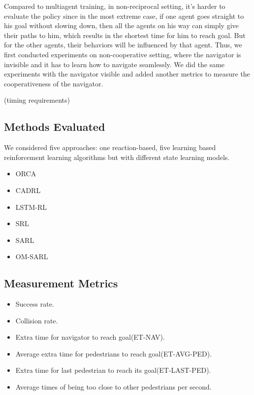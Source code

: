 \documentclass[letterpaper, 10 pt, conference]{ieeeconf}  %
\begin{document}
Compared to multiagent training, in non-reciprocal setting, it's harder to evaluate the policy since in the most extreme case, if one agent goes straight to his goal without slowing down, then all the agents on his way can simply give their paths to him, which results in the shortest time for him to reach goal. But for the other agents, their behaviors will be influenced by that agent. Thus, we first conducted experiments on non-cooperative setting, where the navigator is invisible and it has to learn how to navigate seamlessly. We did the same experiments with the navigator visible and added another metrics to measure the cooperativeness of the navigator. 


(timing requirements)

\subsection{Methods Evaluated}
We considered five approaches: one reaction-based, five learning based reinforcement learning algorithms but with different state learning models.

\begin{itemize}

\item ORCA
\item CADRL
\item LSTM-RL
\item SRL
\item SARL
\item OM-SARL

\end{itemize}


\subsection{Measurement Metrics}

\begin{itemize}

\item Success rate.
\item Collision rate.
\item Extra time for navigator to reach goal(ET-NAV).
\item Average extra time for pedestrians to reach goal(ET-AVG-PED).
\item Extra time for last pedestrian to reach its goal(ET-LAST-PED).
\item Average times of being too close to other pedestrians per second.

\end{itemize}
\end{document}
